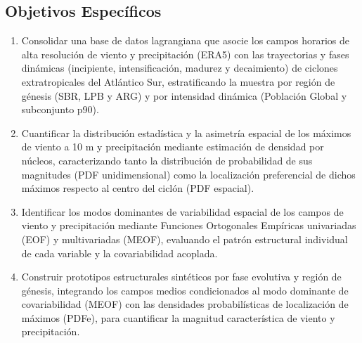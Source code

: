 \subsection{Objetivos Específicos}
\begin{enumerate}
    \item Consolidar una base de datos lagrangiana que asocie los campos horarios de alta resolución de viento y precipitación (ERA5) con las trayectorias y fases dinámicas (incipiente, intensificación, madurez y decaimiento) de ciclones extratropicales del Atlántico Sur, estratificando la muestra por región de génesis (SBR, LPB y ARG) y por intensidad dinámica (Población Global y subconjunto p90).
    \item Cuantificar la distribución estadística y la asimetría espacial de los máximos de viento a 10 m y precipitación mediante estimación de densidad por núcleos, caracterizando tanto la distribución de probabilidad de sus magnitudes (PDF unidimensional) como la localización preferencial de dichos máximos respecto al centro del ciclón (PDF espacial).
    \item Identificar los modos dominantes de variabilidad espacial de los campos de viento y precipitación mediante Funciones Ortogonales Empíricas univariadas (EOF) y multivariadas (MEOF), evaluando el patrón estructural individual de cada variable y la covariabilidad acoplada.
    \item Construir prototipos estructurales sintéticos por fase evolutiva y región de génesis, integrando los campos medios condicionados al modo dominante de covariabilidad (MEOF) con las densidades probabilísticas de localización de máximos (PDFe), para cuantificar la magnitud característica de viento y precipitación.
\end{enumerate}